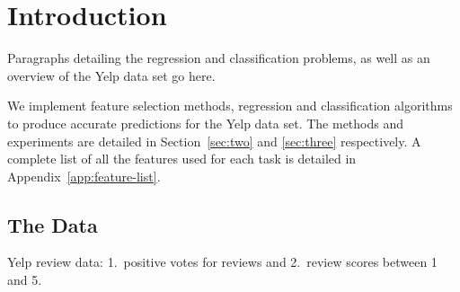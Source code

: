 \section{Introduction}
\label{sec:one}

Paragraphs detailing the regression and classification problems, as well as an
overview of the Yelp data set go here.

We implement feature selection methods, regression and classification algorithms
to produce accurate predictions for the Yelp data set.  The methods and
experiments are detailed in Section~\ref{sec:two} and \ref{sec:three}
respectively.  A complete list of all the features used for each task is
detailed in Appendix~\ref{app:feature-list}.

\subsection{The Data}

Yelp review data: 1.\ positive votes for reviews and 2.\ review scores between 1
and 5.

